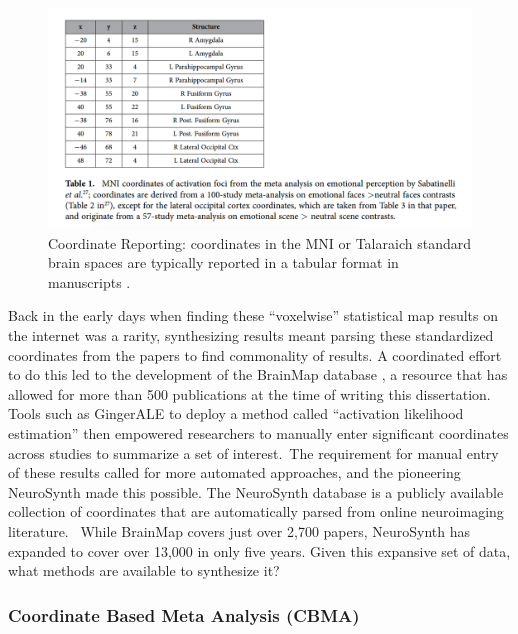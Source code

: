 \documentclass{report}
\begin{document}
\begin{figure}[h!]
\begin{center}
\includegraphics[width=15cm]{images/figure11.png}
\end{center}
\caption{\label{fig:11} Coordinate Reporting: coordinates in the MNI or Talaraich standard brain spaces are typically reported in a tabular format in manuscripts \cite{Boubela2015-ap}.}
\end{figure}

Back in the early days when finding these ``voxelwise'' statistical map
results on the internet was a rarity, synthesizing results meant parsing
these standardized coordinates from the papers to find commonality of
results. A coordinated effort to do this led to the development of the
BrainMap database \cite{Laird2005-gm},
a resource that has allowed for more than 500 publications at the time
of writing this dissertation. Tools such as GingerALE \cite{Brown2005-sb} to
deploy a method called ``activation likelihood estimation'' \cite{Eickhoff2012-iw}
then empowered researchers to manually enter significant coordinates across
studies to summarize a set of interest.~The requirement for manual entry
of these results called for more automated approaches, and the
pioneering NeuroSynth \cite{Yarkoni2011-rg} made
this possible. The NeuroSynth database is a publicly available
collection of coordinates that are automatically parsed from online
neuroimaging literature. ~While BrainMap covers just over 2,700 papers,
NeuroSynth has expanded to cover over 13,000 in only five years. Given
this expansive set of data, what methods are available to synthesize it?

\subsubsection{Coordinate Based Meta Analysis (CBMA)}
\end{document}
